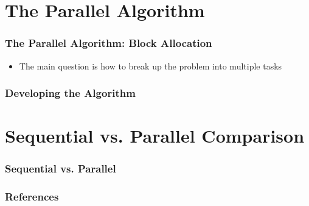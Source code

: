 \documentclass[13pt]{beamer}
\begin{document}
\section{The Parallel Algorithm} %
\begin{frame}
\frametitle{The Parallel Algorithm: Block Allocation}
  \begin{itemize}
    \item The main question is how to break up the problem into multiple tasks
  \end{itemize}
\end{frame}

\begin{frame}
\frametitle{Developing the Algorithm}
  
\end{frame}

\section{Sequential vs. Parallel Comparison} %
\begin{frame}
\frametitle{Sequential vs. Parallel}
  
\end{frame}

 \begin{frame}
  \frametitle{References}
  \nocite{*} 
  
\end{frame}
\end{document}
